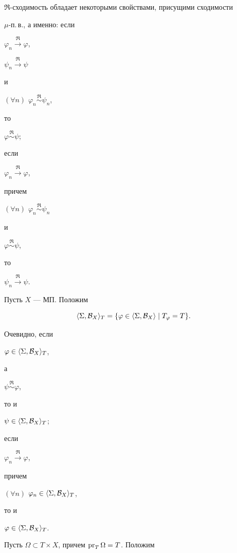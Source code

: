 $\Re$-сходимость обладает некоторыми свойствами, присущими сходимости


$\mu$-п.\,в., а именно: если


$\varphi_n\overset{\Re}{\longrightarrow}\varphi$,


$\psi_n\overset{\Re}{\longrightarrow}\psi$


и


$(\forall n)$ \; $\varphi_n\overset{\Re}{\sim}\psi_n$,


то


$\varphi\overset{\Re}{\sim}\psi$;


если


$\varphi_n\overset{\Re}{\longrightarrow}\varphi$,


причем


$(\forall n)$ \; $\varphi_n\overset{\Re}{\sim}\psi_n$


и


$\varphi\overset{\Re}{\sim}\psi$,


то


$\psi_n\overset{\Re}{\longrightarrow}\psi$.





Пусть $X$ --- МП. Положим


$$


\langle \Sigma ,{\cal B}_X\rangle_T = \{\varphi\in\langle \Sigma,


{\cal B}_X\rangle \mid T_\varphi=T\}.


$$





Очевидно, если


$\varphi\in\langle \Sigma ,{\cal B}_X\rangle _T$,


а


$\psi\overset{\Re}{\sim}\varphi$,


то и


$\psi\in\langle \Sigma ,{\cal B}_X\rangle _T$;


если


$\varphi_n\overset{\Re}{\longrightarrow}\varphi$,


причем


$(\forall n)$ \; $\varphi_n\in\langle \Sigma,{\cal B}_X\rangle _T$,


то и


$\varphi\in\langle \Sigma ,{\cal B}_X\rangle _T$.





Пусть $\Omega\subset T\times X$, причем $\operatorname{pr}_T\Omega=T$. Положим


